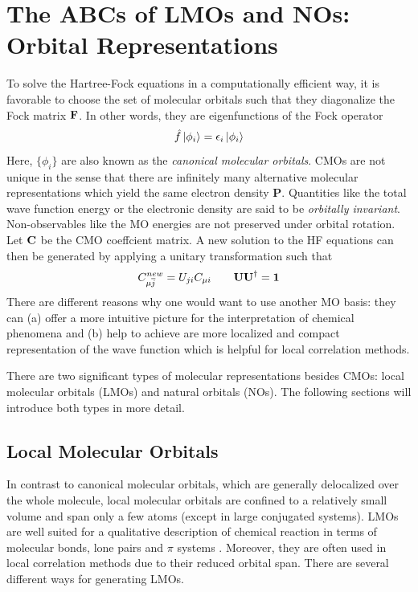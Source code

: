 \section{The ABCs of LMOs and NOs: Orbital Representations \label{sec:ABCLMO}}

To solve the Hartree-Fock equations in a computationally efficient way, it is favorable to choose the set of molecular orbitals such that they diagonalize the Fock matrix $\mathbf{F}$. In other words, they are eigenfunctions of the Fock operator
\begin{equation}
\hat{f}\ket{\smash{\phi_i}} = \epsilon_i \ket{\smash{\phi_i}}
\end{equation} 
\noindent Here, $\{\phi_i\}$ are also known as the \emph{canonical molecular orbitals}. CMOs are not unique in the sense that there are infinitely many alternative molecular representations which yield the same electron density $\mathbf{P}$. Quantities like the total wave function energy or the electronic density are said to be \emph{orbitally invariant}. Non-observables like the MO energies are not preserved under orbital rotation. Let $\mathbf{C}$ be the CMO coeffcient matrix. A new solution to the HF equations can then be generated by applying a unitary transformation such that
\begin{equation}
C^{new}_{\mu \overline{j}} = U_{ji} C_{\mu i} \qquad \mathbf{UU}^{\dagger} = \mathbf{1}
\end{equation} 
\noindent There are different reasons why one would want to use another MO basis: they can (a) offer a more intuitive picture for the interpretation of chemical phenomena and (b) help to achieve are more localized and compact representation of the wave function which is helpful for local correlation methods.

There are two significant types of molecular representations besides CMOs: local molecular orbitals (LMOs) and natural orbitals (NOs). The following sections will introduce both  types in more detail.

\subsection{Local Molecular Orbitals}

In contrast to canonical molecular orbitals, which are generally delocalized over the whole molecule, local molecular orbitals are confined to a relatively small volume and span only a few atoms (except in large conjugated systems). LMOs are well suited for a qualitative description of chemical reaction in terms of molecular bonds, lone pairs and $\pi$ systems \cite{Set2019}. Moreover, they are often used in local correlation methods due to their reduced orbital span. There are several different ways for generating LMOs.

